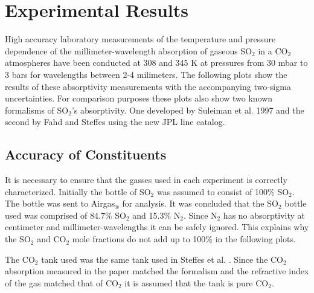 \clearpage
\section{Experimental Results}
High accuracy laboratory measurements of the temperature and pressure dependence of the millimeter-wavelength absorption of gaseous SO$_2$ in a CO$_2$ atmospheres have been conducted at 308 and 345 K at pressures from 30 mbar to 3 bars for wavelengths between 2-4 milimeters. The following plots show the results of these absorptivity measurements with the accompanying two-sigma uncertainties. For comparison purposes these plots also show two known formalisms of SO$_2$'s absorptivity. One developed by Suleiman et al. 1997 \cite{Suleiman-thesis} and the second by Fahd and Steffes \cite{Fahd-thesis} using the new JPL line catalog. 

\subsection{Accuracy of Constituents}

It is necessary to ensure that the gasses used in each experiment is correctly characterized. Initially the bottle of SO$_2$ was assumed to consist of 100\% SO$_2$. The bottle was sent to Airgas$_\circledR$ for analysis. It was concluded that the SO$_2$ bottle used was comprised of 84.7\% SO$_2$ and 15.3\% N$_2$. Since N$_2$ has no absorptivity at centimeter and millimeter-wavelengths it can be safely ignored. This explains why the SO$_2$  and CO$_2$ mole fractions do not add up to 100\% in the following plots. 




The CO$_2$ tank used was the same tank used in Steffes et al. \cite{Steffes-2014}. Since the CO$_2$ absorption measured in the paper matched the formalism and the refractive index of the gas matched that of CO$_2$ it is assumed that the tank is pure CO$_2$.

